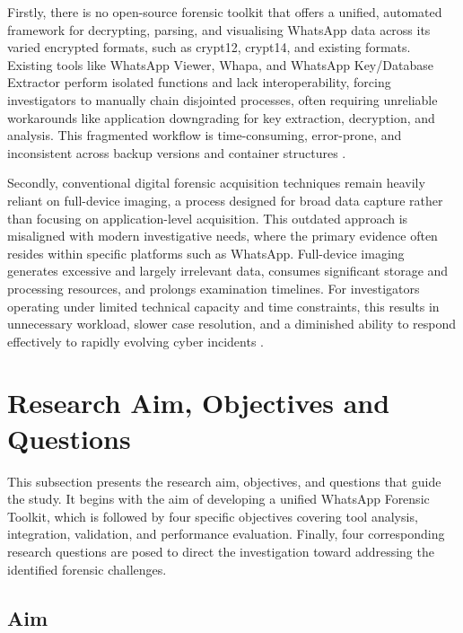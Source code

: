 \documentclass[12pt,a4paper]{report}
\begin{document}
Firstly, there is no open-source forensic toolkit that offers a unified, automated framework for decrypting, parsing, and visualising WhatsApp data across its varied encrypted formats, such as crypt12, crypt14, and existing formats. Existing tools like WhatsApp Viewer, Whapa, and WhatsApp Key/Database Extractor perform isolated functions and lack interoperability, forcing investigators to manually chain disjointed processes, often requiring unreliable workarounds like application downgrading for key extraction, decryption, and analysis. This fragmented workflow is time-consuming, error-prone, and inconsistent across backup versions and container structures \citep{tusharanshu2023}.

Secondly, conventional digital forensic acquisition techniques remain heavily reliant on full-device imaging, a process designed for broad data capture rather than focusing on application-level acquisition. This outdated approach is misaligned with modern investigative needs, where the primary evidence often resides within specific platforms such as WhatsApp. Full-device imaging generates excessive and largely irrelevant data, consumes significant storage and processing resources, and prolongs examination timelines. For investigators operating under limited technical capacity and time constraints, this results in unnecessary workload, slower case resolution, and a diminished ability to respond effectively to rapidly evolving cyber incidents \citep{aggarwal2019}.

\section{Research Aim, Objectives and Questions}

This subsection presents the research aim, objectives, and questions that guide the study. It begins with the aim of developing a unified WhatsApp Forensic Toolkit, which is followed by four specific objectives covering tool analysis, integration, validation, and performance evaluation. Finally, four corresponding research questions are posed to direct the investigation toward 
addressing the identified forensic challenges.

\subsection{Aim}
\end{document}
